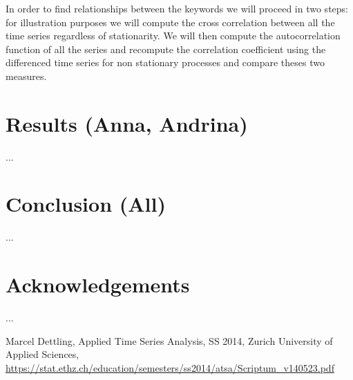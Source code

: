 \documentclass[12pt, a4paper]{article}
\begin{document}
In order to find relationships between the keywords we will proceed in two steps: for illustration purposes we will compute the cross correlation between all the time series regardless of stationarity. We will then compute the autocorrelation function of all the series and recompute the correlation coefficient using the differenced time series for non stationary processes and compare theses two measures.

\section{Results (Anna, Andrina)}
...


\section{Conclusion (All)}
...


\section{Acknowledgements}
...

\begin{thebibliography}{9}

Marcel Dettling, Applied Time Series Analysis, SS 2014, Zurich University of Applied Sciences, 
\url{https://stat.ethz.ch/education/semesters/ss2014/atsa/Scriptum_v140523.pdf}

\end{thebibliography}
\end{document}
